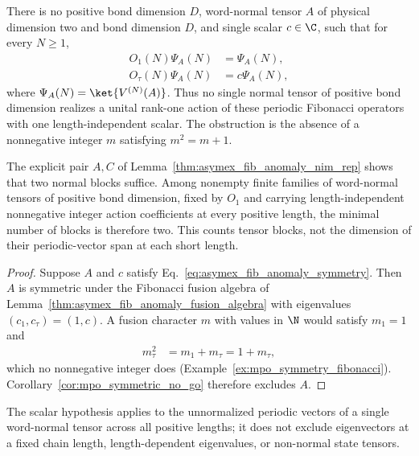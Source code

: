 \begin{lemma}%
    \label{thm:asymex_fib_anomaly_no_go}
    \leanok
    There is no positive bond dimension $D$, word-normal tensor $A$ of
    physical dimension two and bond dimension $D$, and single scalar
    $c\in\C$, such that for every $N\geq1$,
    \begin{align}
        O_1(N)\Psi_A(N)    & =\Psi_A(N), \nonumber \\
        O_\tau(N)\Psi_A(N) & =c\Psi_A(N),
        \label{eq:asymex_fib_anomaly_symmetry}
    \end{align}
    where $\Psi_A(N)=\ket{V^{(N)}(A)}$.
    Thus no single normal tensor of positive bond dimension realizes
    a unital rank-one action of these periodic Fibonacci operators
    with one length-independent scalar. The obstruction is the
    absence of a nonnegative integer $m$ satisfying $m^2=m+1$.

    The explicit pair $A,C$ of
    Lemma~\ref{thm:asymex_fib_anomaly_nim_rep} shows that two normal
    blocks suffice. Among nonempty finite families of word-normal
    tensors of positive bond dimension, fixed by $O_1$ and carrying
    length-independent nonnegative integer action coefficients at
    every positive length, the minimal number of blocks is therefore
    two. This counts tensor blocks, not the dimension of their
    periodic-vector span at each short length.
\end{lemma}

\begin{proof}
    \leanok
    Suppose $A$ and $c$ satisfy
    Eq.~\ref{eq:asymex_fib_anomaly_symmetry}. Then $A$ is symmetric under
    the Fibonacci fusion algebra of
    Lemma~\ref{thm:asymex_fib_anomaly_fusion_algebra} with eigenvalues
    $(c_1,c_\tau)=(1,c)$. A fusion character $m$ with values in $\N$ would
    satisfy $m_1=1$ and
    \begin{align}
        m_\tau^2 & =m_1+m_\tau=1+m_\tau,
    \end{align}
    which no nonnegative integer does
    (Example~\ref{ex:mpo_symmetry_fibonacci}).
    Corollary~\ref{cor:mpo_symmetric_no_go} therefore excludes $A$.
\end{proof}

The scalar hypothesis applies to the unnormalized periodic vectors of a single
word-normal tensor across all positive lengths; it does not exclude
eigenvectors at a fixed chain length, length-dependent eigenvalues, or
non-normal state tensors.
